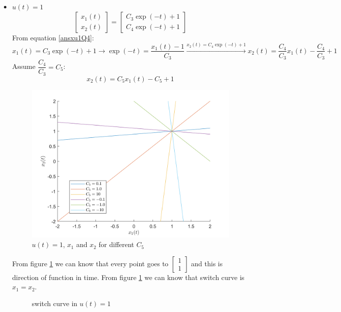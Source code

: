 \begin{itemize}
	\item $u(t) = 1$
	\begin{equation}\label{ansxu1Q4}
		\begin{bmatrix}
			x_1(t) \\
			x_2(t)
		\end{bmatrix}
		= 
		\begin{bmatrix}
			C_3\exp(-t) + 1 \\
			C_4\exp(-t) + 1
		\end{bmatrix}
	\end{equation}
From equation \ref{ansxu1Q4}:
$$x_1(t) = C_3\exp(-t) + 1 \to \exp(-t) = \dfrac{x_1(t)-1}{C_3}\xrightarrow{x_2(t)=C_4\exp(-t) + 1} x_2(t) = \dfrac{C_4}{C_3}x_1(t) -\dfrac{C_4}{C_3} +1$$
Assume $\dfrac{C_4}{C_3} = C_5$:
$$x_2(t) = C_5x_1(t)-C_5 +1$$
\begin{figure}[H]
	\caption{$u(t) = 1$, $x_1$ and $x_2$ for different $C_5$}\label{x1x2u1Q4}
	\centering
	\includegraphics[width=12cm]{../Code/Q4/figures/lowu1x1x2mod.png}
\end{figure}
From figure \ref{x1x2u1Q4} we can know that every point goes to $\begin{bmatrix}
	1\\1
\end{bmatrix}$ and this is direction of function in time. From figure \ref{x1x2u1Q4} we can know that switch curve is $x_1 = x_2$.
\begin{figure}[H]
	\caption{switch curve in $u(t) = 1$}\label{x1x2u1Q4SC}
	\centering

\end{figure}
\end{itemize}
